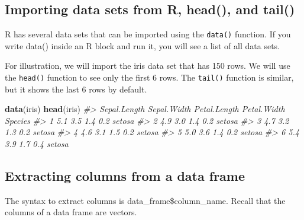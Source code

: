 \documentclass[
]{book}
\newenvironment{Shaded}{\begin{snugshade}}{\end{snugshade}}
\newcommand{\CommentTok}[1]{\textcolor[rgb]{0.56,0.35,0.01}{\textit{#1}}}
\newcommand{\FunctionTok}[1]{\textcolor[rgb]{0.13,0.29,0.53}{\textbf{#1}}}
\newcommand{\NormalTok}[1]{#1}
\theoremstyle{definition}
\theoremstyle{definition}
\theoremstyle{definition}
\theoremstyle{definition}
\theoremstyle{remark}
\begin{document}
\hypertarget{importing-data-sets-from-r-head-and-tail}{%
\subsection*{Importing data sets from R, head(), and tail()}\label{importing-data-sets-from-r-head-and-tail}}

R has several data sets that can be imported using the \texttt{data()} function. If you write data() inside an R block and run it, you will see a list of all data sets.

For illustration, we will import the iris data set that has 150 rows. We will use the \texttt{head()} function to see only the first 6 rows. The \texttt{tail()} function is similar, but it shows the last 6 rows by default.

\begin{Shaded}
\begin{Highlighting}[]
\FunctionTok{data}\NormalTok{(iris)}
\FunctionTok{head}\NormalTok{(iris) }
\CommentTok{\#\textgreater{}   Sepal.Length Sepal.Width Petal.Length Petal.Width Species}
\CommentTok{\#\textgreater{} 1          5.1         3.5          1.4         0.2  setosa}
\CommentTok{\#\textgreater{} 2          4.9         3.0          1.4         0.2  setosa}
\CommentTok{\#\textgreater{} 3          4.7         3.2          1.3         0.2  setosa}
\CommentTok{\#\textgreater{} 4          4.6         3.1          1.5         0.2  setosa}
\CommentTok{\#\textgreater{} 5          5.0         3.6          1.4         0.2  setosa}
\CommentTok{\#\textgreater{} 6          5.4         3.9          1.7         0.4  setosa}
\end{Highlighting}
\end{Shaded}

\hypertarget{extracting-columns-from-a-data-frame}{%
\subsection*{Extracting columns from a data frame}\label{extracting-columns-from-a-data-frame}}

The syntax to extract columns is data\_frame\$column\_name. Recall that the columns of a data frame are vectors.
\end{document}
